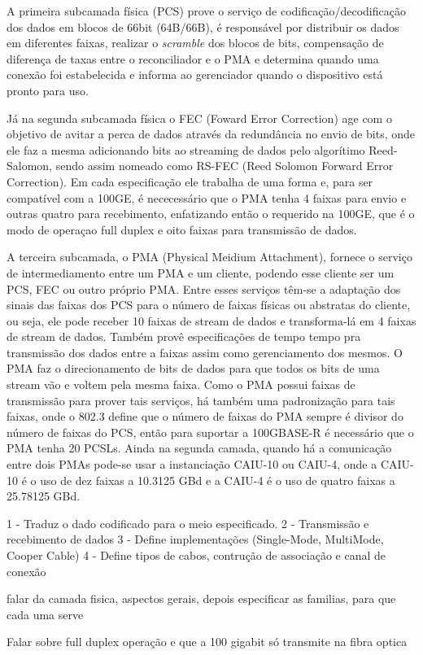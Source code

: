 \documentclass[a4paper,12pt]{article}
\begin{document}
A primeira subcamada física (PCS) prove o serviço de codificação/decodificação dos dados em blocos de 66bit (64B/66B), é responsável por distribuir os dados em diferentes faixas, realizar o \textit{scramble} dos blocos de bits, compensação de diferença de taxas entre o reconciliador e o PMA e determina quando uma conexão foi estabelecida e informa ao gerenciador quando o dispositivo está pronto para uso. 

Já na segunda subcamada física o FEC (Foward Error Correction) age com o objetivo de avitar a perca de dados através da redundância no envio de bits, onde ele faz a mesma adicionando bits ao streaming de dados pelo algorítimo Reed-Salomon, sendo assim nomeado como RS-FEC (Reed Solomon Forward Error Correction).  Em cada especificação ele trabalha de uma forma e, para ser compatível com a 100GE, é nececessário que o PMA tenha 4 faixas para envio e outras quatro para recebimento, enfatizando então o requerido na 100GE, que é o modo de operaçao full duplex e oito faixas para transmissão de dados.


A terceira subcamada, o PMA (Physical Meidium Attachment), fornece o serviço de intermediamento entre um PMA e um cliente, podendo esse cliente ser um PCS, FEC ou outro próprio PMA. Entre esses serviços têm-se a adaptação dos sinais das faixas dos PCS para o número de faixas físicas ou abstratas do cliente, ou seja, ele pode receber 10 faixas de stream de dados e transforma-lá em 4 faixas de stream de dados. Também provê especificações de tempo tempo pra transmissão dos dados entre a faixas assim como gerenciamento dos mesmos. O PMA faz o direcionamento de bits de dados para que todos os bits de uma stream vão e voltem pela mesma faixa. Como o PMA possui faixas de transmissão para prover tais serviços, há também uma padronização para tais faixas, onde o 802.3 define que o número de faixas do PMA sempre é divisor do número de faixas do PCS, então para suportar a 100GBASE-R é necessário que o PMA tenha 20 PCSLs. Ainda na segunda camada, quando há a comunicação entre dois PMAs pode-se usar a instanciação CAIU-10 ou CAIU-4, onde a CAIU-10 é o uso de dez faixas a 10.3125 GBd e a CAIU-4 é o uso de quatro faixas a 25.78125 GBd.


1 - Traduz o dado codificado para o meio especificado.
2 - Transmissão e recebimento de dados
3 - Define implementações (Single-Mode, MultiMode, Cooper Cable)
4 - Define tipos de cabos, contrução de associação e canal de conexão

falar da camada fisica, aspectos gerais, depois especificar as familias, para que cada uma serve

Falar sobre full duplex operação e que a 100 gigabit só transmite na fibra optica
\end{document}
